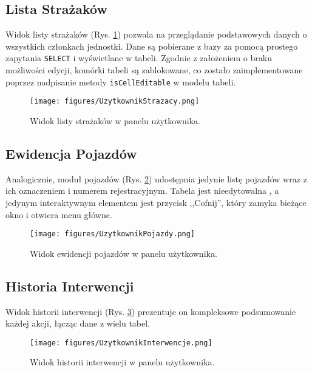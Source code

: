 \subsection*{Lista Strażaków}
\label{ssec:uzytkownik_strazacy}

Widok listy strażaków (Rys. \ref{fig:uzytkownik_strazacy}) pozwala na przeglądanie podstawowych danych o wszystkich członkach jednostki. Dane są pobierane z bazy za pomocą prostego zapytania \texttt{SELECT}  i wyświetlane w tabeli. Zgodnie z założeniem o braku możliwości edycji, komórki tabeli są zablokowane, co zostało zaimplementowane poprzez nadpisanie metody \texttt{isCellEditable} w modelu tabeli.

\begin{figure}[H]
	\centering
	\texttt{[image: figures/UzytkownikStrazacy.png]}
	\caption{Widok listy strażaków w panelu użytkownika.}
	\label{fig:uzytkownik_strazacy}
\end{figure}

\subsection*{Ewidencja Pojazdów}
\label{ssec:uzytkownik_pojazdy}

Analogicznie, moduł pojazdów (Rys. \ref{fig:uzytkownik_pojazdy}) udostępnia jedynie listę pojazdów wraz z ich oznaczeniem i numerem rejestracyjnym. Tabela jest nieedytowalna , a jedynym interaktywnym elementem jest przycisk ,,Cofnij'', który zamyka bieżące okno i otwiera menu główne.

\begin{figure}[H]
	\centering
	\texttt{[image: figures/UzytkownikPojazdy.png]}
	\caption{Widok ewidencji pojazdów w panelu użytkownika.}
	\label{fig:uzytkownik_pojazdy}
\end{figure}

\subsection*{Historia Interwencji}
\label{ssec:uzytkownik_interwencje}

Widok historii interwencji (Rys. \ref{fig:uzytkownik_interwencje}) prezentuje on kompleksowe podsumowanie każdej akcji, łącząc dane z wielu tabel.

\begin{figure}[H]
	\centering
	\texttt{[image: figures/UzytkownikInterwencje.png]}
	\caption{Widok historii interwencji w panelu użytkownika.}
	\label{fig:uzytkownik_interwencje}
\end{figure}

